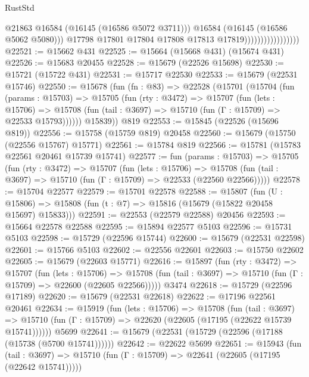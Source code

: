 \begin{lexlean}{RustStd}
\begin{coremodule}
                                          @21863
                                          @16584
                                          (@16145 (@16586 @5072 @3711)))
                                        @16584
                                        (@16145 (@16586 @5062 @5080)))
                                      @17798
                                      @17801
                                      @17804
                                      @17808
                                      @17813
                                      @17819)))))))))))))))))
@22521 := @15662 @431
@22525 := @15664 (@15668 @431) (@15674 @431)
@22526 := @15683 @20455
@22528 := @15679 (@22526 @15698)
@22530 := @15721 (@15722 @431)
@22531 := @15717 @22530
@22533 := @15679 (@22531 @15746)
@22550 := @15678
    (fun (fn : @83) =>
    @22528
      (@15701
        (@15704
          (fun (params : @15703) =>
          @15705
            (fun (rty : @3472) =>
            @15707
              (fun (lets : @15706) =>
              @15708 (fun (tail : @3697) => @15710 (fun (Γ : @15709) => @22533 @15793))))))
        @15839))
    @819
@22553 := @15845 (@22526 (@15696 @819))
@22556 := @15758 (@15759 @819) @20458
@22560 := @15679 (@15750 (@22556 @15767) @15771)
@22561 := @15784 @819
@22566 := @15781 (@15783 @22561 @20461 @15739 @15741)
@22577 := fun (params : @15703) =>
  @15705
    (fun (rty : @3472) =>
    @15707
      (fun (lets : @15706) =>
      @15708 (fun (tail : @3697) => @15710 (fun (Γ : @15709) => @22533 (@22560 @22566)))))
@22578 := @15704 @22577
@22579 := @15701 @22578
@22588 := @15807
    (fun (U : @15806) => @15808 (fun (t : @7) => @15816 (@15679 (@15822 @20458 @15697) @15833)))
@22591 := @22553 (@22579 @22588) @20456
@22593 := @15664 @22578 @22588
@22595 := @15894 @22577 @5103
@22596 := @15731 @5103
@22598 := @15729 (@22596 @15744)
@22600 := @15679 (@22531 @22598)
@22601 := @15766 @5103
@22602 := @22556 @22601
@22603 := @15750 @22602
@22605 := @15679 (@22603 @15771)
@22616 := @15897
    (fun (rty : @3472) =>
    @15707
      (fun (lets : @15706) =>
      @15708 (fun (tail : @3697) => @15710 (fun (Γ : @15709) => @22600 (@22605 @22566)))))
    @3474
@22618 := @15729 (@22596 @17189)
@22620 := @15679 (@22531 @22618)
@22622 := @17196 @22561 @20461
@22634 := @15919
    (fun (lets : @15706) =>
    @15708
      (fun (tail : @3697) =>
      @15710 (fun (Γ : @15709) => @22620 (@22605 (@17195 (@22622 @15739 @15741))))))
    @5699
@22641 := @15679 (@22531 (@15729 (@22596 (@17188 (@15738 (@5700 @15741))))))
@22642 := @22622 @5699
@22651 := @15943
    (fun (tail : @3697) => @15710 (fun (Γ : @15709) => @22641 (@22605 (@17195 (@22642 @15741)))))

\end{coremodule}
\end{lexlean}
